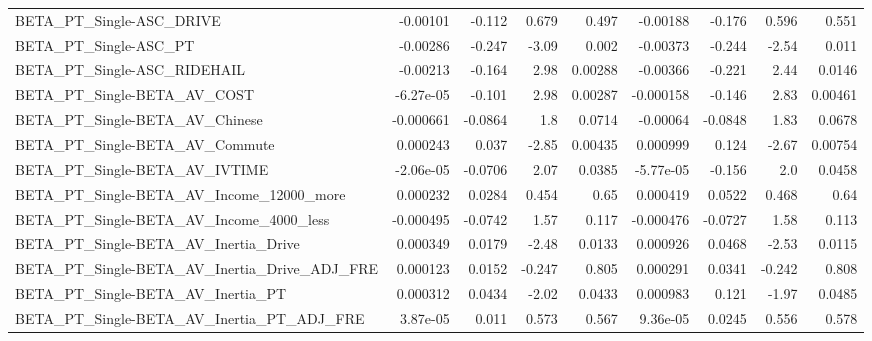 \begin{tabular}{lrrrrrrrr}
BETA\_PT\_Single-ASC\_DRIVE                           &    -0.00101 &       -0.112 &    0.679 &    0.497 &   -0.00188 &      -0.176 &        0.596 &         0.551 \\
BETA\_PT\_Single-ASC\_PT                              &    -0.00286 &       -0.247 &    -3.09 &    0.002 &   -0.00373 &      -0.244 &        -2.54 &         0.011 \\
BETA\_PT\_Single-ASC\_RIDEHAIL                        &    -0.00213 &       -0.164 &     2.98 &  0.00288 &   -0.00366 &      -0.221 &         2.44 &        0.0146 \\
BETA\_PT\_Single-BETA\_AV\_COST                        &   -6.27e-05 &       -0.101 &     2.98 &  0.00287 &  -0.000158 &      -0.146 &         2.83 &       0.00461 \\
BETA\_PT\_Single-BETA\_AV\_Chinese                     &   -0.000661 &      -0.0864 &      1.8 &   0.0714 &   -0.00064 &     -0.0848 &         1.83 &        0.0678 \\
BETA\_PT\_Single-BETA\_AV\_Commute                     &    0.000243 &        0.037 &    -2.85 &  0.00435 &   0.000999 &       0.124 &        -2.67 &       0.00754 \\
BETA\_PT\_Single-BETA\_AV\_IVTIME                      &   -2.06e-05 &      -0.0706 &     2.07 &   0.0385 &  -5.77e-05 &      -0.156 &          2.0 &        0.0458 \\
BETA\_PT\_Single-BETA\_AV\_Income\_12000\_more           &    0.000232 &       0.0284 &    0.454 &     0.65 &   0.000419 &      0.0522 &        0.468 &          0.64 \\
BETA\_PT\_Single-BETA\_AV\_Income\_4000\_less            &   -0.000495 &      -0.0742 &     1.57 &    0.117 &  -0.000476 &     -0.0727 &         1.58 &         0.113 \\
BETA\_PT\_Single-BETA\_AV\_Inertia\_Drive               &    0.000349 &       0.0179 &    -2.48 &   0.0133 &   0.000926 &      0.0468 &        -2.53 &        0.0115 \\
BETA\_PT\_Single-BETA\_AV\_Inertia\_Drive\_ADJ\_FRE       &    0.000123 &       0.0152 &   -0.247 &    0.805 &   0.000291 &      0.0341 &       -0.242 &         0.808 \\
BETA\_PT\_Single-BETA\_AV\_Inertia\_PT                  &    0.000312 &       0.0434 &    -2.02 &   0.0433 &   0.000983 &       0.121 &        -1.97 &        0.0485 \\
BETA\_PT\_Single-BETA\_AV\_Inertia\_PT\_ADJ\_FRE          &    3.87e-05 &        0.011 &    0.573 &    0.567 &   9.36e-05 &      0.0245 &        0.556 &         0.578 \\

\end{tabular}
